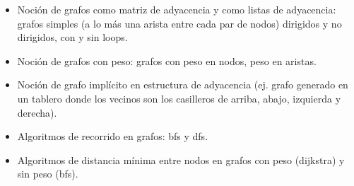 \begin{itemize}
\item[\ultra] Noción de grafos como matriz de adyacencia y como listas de
  adyacencia: grafos simples (a lo más una arista entre cada par de nodos)
  dirigidos y no dirigidos, con y sin loops.
\item[\ultra] Noción de grafos con peso: grafos con peso en nodos, peso en aristas.
\item[\ultra] Noción de grafo implícito en estructura de adyacencia (ej.
  grafo generado en un tablero donde los vecinos son los casilleros de arriba,
  abajo, izquierda y derecha).
\item[\ultra] Algoritmos de recorrido en grafos: bfs y dfs.
\item[\ultra] Algoritmos de distancia mínima entre nodos en grafos con peso
  (dijkstra) y sin peso (bfs).
\end{itemize}



